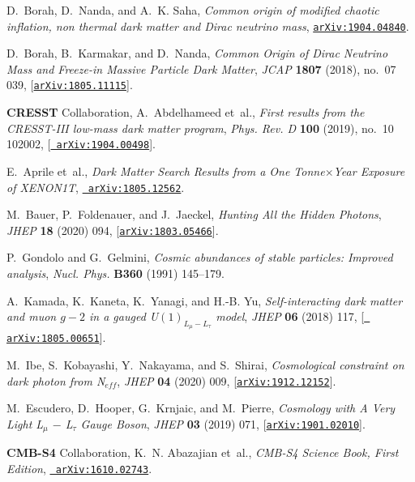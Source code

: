 \documentclass[prd,nofootinbib,preprint,superscriptaddress]{revtex4}
\begin{document}
\begin{thebibliography}{100}
D.~Borah, D.~Nanda, and A.~K. Saha, {\it {Common origin of modified chaotic
  inflation, non thermal dark matter and Dirac neutrino mass}},
  \href{http://arxiv.org/abs/1904.04840}{{\tt arXiv:1904.04840}}.

D.~Borah, B.~Karmakar, and D.~Nanda, {\it {Common Origin of Dirac Neutrino Mass
  and Freeze-in Massive Particle Dark Matter}},  {\em JCAP} {\bf 1807} (2018),
  no.~07 039, [\href{http://arxiv.org/abs/1805.11115}{{\tt arXiv:1805.11115}}].

{\bf CRESST} Collaboration, A.~Abdelhameed et~al., {\it {First results from the
  CRESST-III low-mass dark matter program}},  {\em Phys. Rev. D} {\bf 100}
  (2019), no.~10 102002, [\href{http://arxiv.org/abs/1904.00498}{{\tt
  arXiv:1904.00498}}].

E.~Aprile et~al., {\it {Dark Matter Search Results from a One Tonne$\times$Year
  Exposure of XENON1T}},  \href{http://arxiv.org/abs/1805.12562}{{\tt
  arXiv:1805.12562}}.

M.~Bauer, P.~Foldenauer, and J.~Jaeckel, {\it {Hunting All the Hidden
  Photons}},  {\em JHEP} {\bf 18} (2020) 094,
  [\href{http://arxiv.org/abs/1803.05466}{{\tt arXiv:1803.05466}}].

P.~Gondolo and G.~Gelmini, {\it {Cosmic abundances of stable particles:
  Improved analysis}},  {\em Nucl. Phys.} {\bf B360} (1991) 145--179.

A.~Kamada, K.~Kaneta, K.~Yanagi, and H.-B. Yu, {\it {Self-interacting dark
  matter and muon $g-2$ in a gauged U$(1)_{L_{\mu} - L_{\tau}}$ model}},  {\em
  JHEP} {\bf 06} (2018) 117, [\href{http://arxiv.org/abs/1805.00651}{{\tt
  arXiv:1805.00651}}].

M.~Ibe, S.~Kobayashi, Y.~Nakayama, and S.~Shirai, {\it {Cosmological constraint
  on dark photon from N$_{eff}$}},  {\em JHEP} {\bf 04} (2020) 009,
  [\href{http://arxiv.org/abs/1912.12152}{{\tt arXiv:1912.12152}}].

M.~Escudero, D.~Hooper, G.~Krnjaic, and M.~Pierre, {\it {Cosmology with A Very
  Light L$_{\mu}$ $-$ L$_{\tau}$ Gauge Boson}},  {\em JHEP} {\bf 03} (2019)
  071, [\href{http://arxiv.org/abs/1901.02010}{{\tt arXiv:1901.02010}}].

{\bf CMB-S4} Collaboration, K.~N. Abazajian et~al., {\it {CMB-S4 Science Book,
  First Edition}},  \href{http://arxiv.org/abs/1610.02743}{{\tt
  arXiv:1610.02743}}.


\end{thebibliography}
\end{document}

